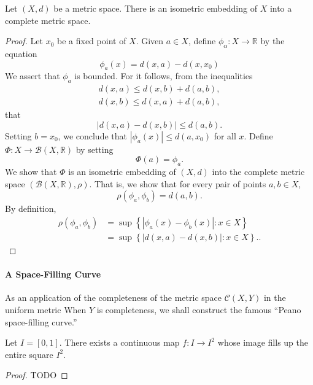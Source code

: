 \begin{theorem}
  Let \( (X, d) \) be a metric space.
  There is an isometric embedding of \( X \) into a complete metric space.
\end{theorem}
\begin{proof}
  Let \( x_0 \) be a fixed point of \( X \).
  Given \( a \in X \), define \( \phi_\alpha: X \to \mathbb{R} \) by the equation
  \[
    \phi_a(x) = d(x, a) - d(x, x_0)
  \]
  We assert that \( \phi_a \) is bounded.
  For it follows, from the inequalities
  \begin{align*}
  d(x, a) \leq d(x, b) + d(a, b),\\
  d(x, b) \leq d(x, a) + d(a, b),
  \end{align*}
  that
  \[
    \left\vert d(x, a) - d(x, b) \right\vert \leq d(a, b).
  \]
  Setting \( b = x_0 \), we conclude that \( \left\vert \phi_a(x) \right\vert \leq d(a, x_0) \) for all \( x \).
  Define \( \Phi: X \to \mathcal{B}(X, \mathbb{R}) \) by setting
  \[
    \Phi(a) = \phi_a.
  \]
  We show that \( \Phi \) is an isometric embedding of \( (X, d) \) into the complete metric space \( (\mathcal{B}(X, \mathbb{R}), \rho) \).
  That is, we show that for every pair of points \( a, b \in X \),
  \[
    \rho(\phi_a, \phi_b) = d(a, b).
  \]
  By definition,
  \begin{align*}
    \rho(\phi_a, \phi_b) &= \sup \left\lbrace \left\vert \phi_a(x) - \phi_b(x) \right\vert: x \in X \right\rbrace\\
                         &= \sup \left\lbrace \left\vert d(x, a) - d(x, b) \right\vert: x \in X \right\rbrace.
  .\end{align*}
\end{proof}

\paragraph{A Space-Filling Curve}

As an application of the completeness of the metric space \( \mathcal{C}(X, Y) \) in the uniform metric When \( Y \) is completeness, we shall construct the famous ``Peano space-filling curve.''

\begin{theorem}
  Let \( I = [0, 1] \).
  There exists a continuous map \( f: I \to I^2 \) whose image fills up the entire square \( I^2 \).
\end{theorem}
\begin{proof}
  TODO %
\end{proof}

